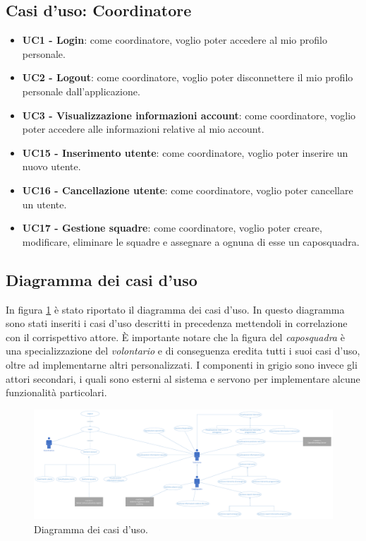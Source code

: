 \subsection{Casi d'uso: Coordinatore}
\begin{itemize}
	\item \textbf{UC1 - Login}:
	come coordinatore, voglio poter accedere al mio profilo personale.
	
	\item \textbf{UC2 - Logout}:
	come coordinatore, voglio poter disconnettere il mio profilo personale dall'applicazione.
	
	\item \textbf{UC3 - Visualizzazione informazioni account}:
	come coordinatore, voglio poter accedere alle informazioni relative al mio account.
	
	\item \textbf{UC15 - Inserimento utente}:
	come coordinatore, voglio poter inserire un nuovo utente.
	
	\item \textbf{UC16 - Cancellazione utente}:
	come coordinatore, voglio poter cancellare un utente.
	
	\item \textbf{UC17 - Gestione squadre}:
	come coordinatore, voglio poter creare, modificare, eliminare le squadre e assegnare a ognuna di esse un caposquadra.
\end{itemize}

\clearpage
\subsection{Diagramma dei casi d'uso}
In figura \ref{fig:UseCaseDiagram} è stato riportato il diagramma dei casi d'uso. In questo diagramma sono stati inseriti i casi d'uso descritti in precedenza mettendoli in correlazione con il corrispettivo attore. È importante notare che la figura del \textit{caposquadra} è una specializzazione del \textit{volontario} e di conseguenza eredita tutti i suoi casi d'uso, oltre ad implementarne altri personalizzati. 
I componenti in grigio sono invece gli attori secondari, i quali sono esterni al sistema e servono per implementare alcune funzionalità particolari.
\begin{landscape}
	\begin{figure}[b]
		\centering
		\includegraphics[width=1\linewidth]{./Iterazione 0/OtherFiles/Use cases diagram}
		\caption{Diagramma dei casi d'uso.}
		\label{fig:UseCaseDiagram}
	\end{figure}
\end{landscape}

